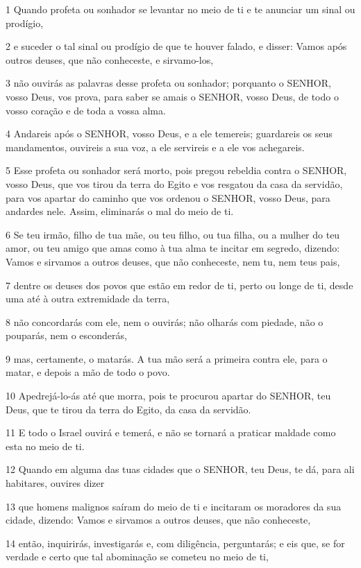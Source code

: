 \par 1 Quando profeta ou sonhador se levantar no meio de ti e te anunciar um sinal ou prodígio,
\par 2 e suceder o tal sinal ou prodígio de que te houver falado, e disser: Vamos após outros deuses, que não conheceste, e sirvamo-los,
\par 3 não ouvirás as palavras desse profeta ou sonhador; porquanto o SENHOR, vosso Deus, vos prova, para saber se amais o SENHOR, vosso Deus, de todo o vosso coração e de toda a vossa alma.
\par 4 Andareis após o SENHOR, vosso Deus, e a ele temereis; guardareis os seus mandamentos, ouvireis a sua voz, a ele servireis e a ele vos achegareis.
\par 5 Esse profeta ou sonhador será morto, pois pregou rebeldia contra o SENHOR, vosso Deus, que vos tirou da terra do Egito e vos resgatou da casa da servidão, para vos apartar do caminho que vos ordenou o SENHOR, vosso Deus, para andardes nele. Assim, eliminarás o mal do meio de ti.
\par 6 Se teu irmão, filho de tua mãe, ou teu filho, ou tua filha, ou a mulher do teu amor, ou teu amigo que amas como à tua alma te incitar em segredo, dizendo: Vamos e sirvamos a outros deuses, que não conheceste, nem tu, nem teus pais,
\par 7 dentre os deuses dos povos que estão em redor de ti, perto ou longe de ti, desde uma até à outra extremidade da terra,
\par 8 não concordarás com ele, nem o ouvirás; não olharás com piedade, não o pouparás, nem o esconderás,
\par 9 mas, certamente, o matarás. A tua mão será a primeira contra ele, para o matar, e depois a mão de todo o povo.
\par 10 Apedrejá-lo-ás até que morra, pois te procurou apartar do SENHOR, teu Deus, que te tirou da terra do Egito, da casa da servidão.
\par 11 E todo o Israel ouvirá e temerá, e não se tornará a praticar maldade como esta no meio de ti.
\par 12 Quando em alguma das tuas cidades que o SENHOR, teu Deus, te dá, para ali habitares, ouvires dizer
\par 13 que homens malignos saíram do meio de ti e incitaram os moradores da sua cidade, dizendo: Vamos e sirvamos a outros deuses, que não conheceste,
\par 14 então, inquirirás, investigarás e, com diligência, perguntarás; e eis que, se for verdade e certo que tal abominação se cometeu no meio de ti,
